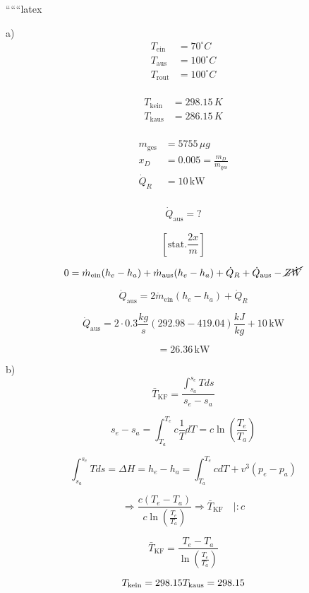 
``````latex


a) 
\begin{align*}
T_{\text{ein}} &= 70^\circ C \\
T_{\text{aus}} &= 100^\circ C \\
T_{\text{rout}} &= 100^\circ C \\
\end{align*}

\begin{align*}
T_{\text{kein}} &= 298.15\,K \\
T_{\text{kaus}} &= 286.15\,K \\
\end{align*}

\begin{align*}
m_{\text{ges}} &= 5755\,\mu g \\
x_D &= 0.005 = \frac{m_D}{m_{\text{ges}}} \\
\dot{Q}_R &= 10\,\text{kW} \\
\end{align*}

\begin{align*}
\dot{Q}_{\text{aus}} = ?
\end{align*}

\[
\left[ \text{stat.} \frac{2x}{m} \right]
\]

\[
0 = \dot{m}_{\text{ein}} (h_e - h_a) + \dot{m}_{\text{aus}} (h_e - h_a) + \dot{Q}_R + \dot{Q}_{\text{aus}} - \cancel{Z\dot{W}}
\]

\[
\dot{Q}_{\text{aus}} = 2\dot{m}_{\text{ein}} (h_e - h_a) + \dot{Q}_R
\]

\[
\dot{Q}_{\text{aus}} = 2 \cdot 0.3 \frac{kg}{s} (292.98 - 419.04) \frac{kJ}{kg} + 10\,\text{kW}
\]

\[
= 26.36\,\text{kW}
\]

b) 
\[
\bar{T}_{\text{KF}} = \frac{\int_{s_a}^{s_e} T ds}{s_e - s_a}
\]

\[
s_e - s_a = \int_{T_a}^{T_e} c \frac{1}{T} dT = c \ln \left( \frac{T_e}{T_a} \right)
\]

\[
\int_{s_a}^{s_e} T ds = \Delta H = h_e - h_a = \int_{T_a}^{T_e} c dT + v^3 \left( p_e - p_a \right)
\]

\[
\Rightarrow \frac{c \left( T_e - T_a \right)}{c \ln \left( \frac{T_e}{T_a} \right)} \Rightarrow \bar{T}_{\text{KF}} \quad | : c
\]

\[
\bar{T}_{\text{KF}} = \frac{T_e - T_a}{\ln \left( \frac{T_e}{T_a} \right)}
\]

\[
T_{\text{kein}} = 298.15 \\
T_{\text{kaus}} = 298.15
\]

